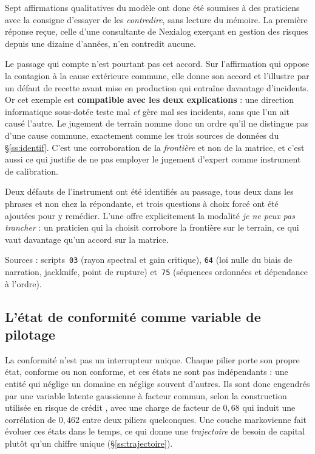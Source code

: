 \documentclass[12pt,a4paper]{article}
\theoremstyle{definition}
\begin{document}
Sept affirmations qualitatives du modèle ont donc été soumises à des praticiens
avec la consigne d'essayer de les \emph{contredire}, sans lecture du mémoire. La
première réponse reçue, celle d'une consultante de Nexialog exerçant en gestion des
risques depuis une dizaine d'années, n'en contredit aucune.

Le passage qui compte n'est pourtant pas cet accord. Sur l'affirmation qui oppose
la contagion à la cause extérieure commune, elle donne son accord et l'illustre par
un défaut de recette avant mise en production qui entraîne davantage d'incidents.
Or cet exemple est \textbf{compatible avec les deux explications} : une direction
informatique sous-dotée teste mal \emph{et} gère mal ses incidents, sans que l'un
ait causé l'autre. Le jugement de terrain nomme donc un ordre qu'il ne distingue
pas d'une cause commune, exactement comme les trois sources de données du
\S\ref{ss:identif}. C'est une corroboration de la \emph{frontière} et non de la
matrice, et c'est aussi ce qui justifie de ne pas employer le jugement d'expert
comme instrument de calibration.

Deux défauts de l'instrument ont été identifiés au passage, tous deux dans les
phrases et non chez la répondante, et trois questions à choix forcé ont été
ajoutées pour y remédier. L'une offre explicitement la modalité \emph{je ne peux
pas trancher} : un praticien qui la choisit corrobore la frontière sur le terrain,
ce qui vaut davantage qu'un accord sur la matrice.

\vspace{4pt}
\noindent Sources : scripts~\texttt{03} (rayon spectral et gain critique),
\texttt{64} (loi nulle du biais de narration, jackknife, point de rupture)
et~\texttt{75} (séquences ordonnées et dépendance à l'ordre).

\subsection{L'état de conformité comme variable de pilotage}
\label{ss:etats}

La conformité n'est pas un interrupteur unique. Chaque pilier porte son propre
état, conforme ou non conforme, et ces états ne sont pas indépendants : une entité
qui néglige un domaine en néglige souvent d'autres. Ils sont donc engendrés par
une variable latente gaussienne à facteur commun, selon la construction utilisée
en risque de crédit \citep{Vasicek2002}, avec une charge de facteur de $0{,}68$
qui induit une corrélation de $0{,}462$ entre deux piliers quelconques. Une couche
markovienne fait évoluer ces états dans le temps, ce qui donne une
\emph{trajectoire} de besoin de capital plutôt qu'un chiffre unique
(\S\ref{ss:trajectoire}).
\end{document}

